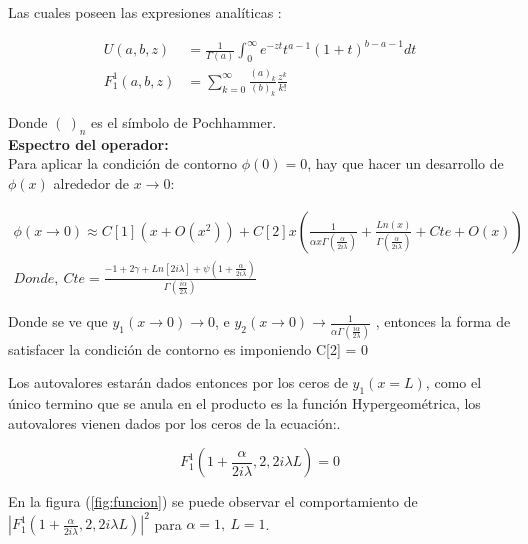 Las cuales poseen las expresiones analíticas  : 

\begin{equation}
\begin{aligned}
	U(a,b,z) &= \frac{1}{\Gamma (a)} 
	\int _0 ^{\infty} e ^{-zt}
	t ^{a-1}
	(1+t) ^{b-a-1}
	dt \\[5pt]
	F _1 ^1 (a,b,z) &= \sum _ {k=0} ^{\infty} 
	\frac{(a) _k}{(b) _k} 
	\frac{z ^k}{k!} 
\end{aligned}
\end{equation}

Donde $( \   ) _n$ es el símbolo de Pochhammer. \\



\textbf{Espectro del operador:} \\


Para aplicar la condición de contorno $\phi (0) = 0$, hay que hacer un desarrollo de $\phi(x)$  alrededor de $x \rightarrow 0$:

\begin{equation}
\begin{array}{c}
\phi (x \rightarrow 0) \approx
C[1] ( x + O(x ^2)) + 
C[2] x 
\left( 
\frac{1}{  \alpha x  \Gamma ( \frac{ \alpha}{2 i \lambda}  )   }  +
\frac{Ln(x) }{\Gamma ( \frac{ \alpha}{2 i \lambda} ) } + Cte + O(x)
\right)
\\[15pt]
Donde,  \ Cte = 
\frac{
-1 + 2 \gamma + Ln[2 i \lambda] + \psi (1 + \frac{ \alpha}{2 i \lambda})
}
{\Gamma (\frac{i \alpha}{2 \lambda})}
\end{array}
\label{eq.scat}
\end{equation}

Donde se ve que $y _1 (x \rightarrow 0 ) \rightarrow 0$, e $y _2 (x \rightarrow 0)  \rightarrow
\frac{1}{  \alpha   \Gamma ( \frac{i \alpha}{2 \lambda}  )   } $ , entonces la forma de satisfacer la condición de contorno es imponiendo C[2] = 0

Los autovalores estarán dados entonces por los ceros de $y_1 (x= L)$, como el único termino que se anula en el producto es la función Hypergeométrica, los autovalores vienen dados por los ceros de la ecuación:.


\begin{equation}
F _1 ^1 (1+\frac{ \alpha}{2 i \lambda},2,2 i \lambda L)  = 0
\label{eq.1}
\end{equation}

En la figura (\ref{fig:funcion}) se puede observar el comportamiento  de $ | F _1 ^1 (1+\frac{ \alpha}{2 i \lambda},2,2 i \lambda L) | ^2 $ para   $\alpha=1, \ L=1$. \\

